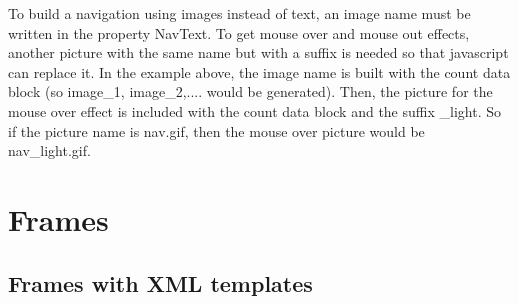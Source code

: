 To build a navigation using images instead of text, an image name must be written in the property
{\name NavText}. To get mouse over and mouse out effects, another picture with the same name but 
with a suffix is needed so that javascript can replace it. In the example above, the 
image name is built with the count data block (so image\_1, image\_2,.... 
would be generated). Then, the picture for the mouse over effect is included with the count
data block and the suffix {\name \_light}. So if the picture 
name is {\name nav.gif}, then the mouse over picture would be nav\_light.gif. \\

\section{Frames}

\subsection{Frames with XML templates}

